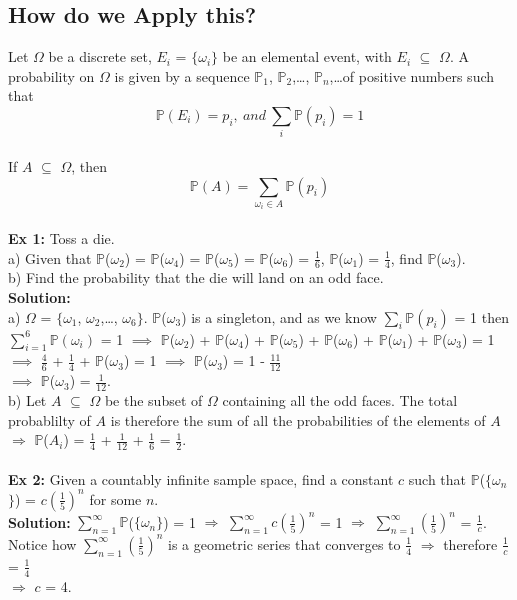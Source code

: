 \documentclass{article}
\newcommand{\bbP}{\mathbb{P}}
\newcommand{\Om}{\Omega}
\newcommand{\imply}{\Rightarrow}
\begin{document}
\subsection{How do we Apply this?}
Let $\Om$ be a discrete set, $E_{i}$ = $\{$$\omega_{i}$$\}$ be an elemental event, with $E_{i}$ $\subseteq$ $\Om$. A probability on $\Om$ is given by a sequence $\bbP_{1}$, $\bbP_{2}$,\dots, $\bbP_{n}$,\dots of positive numbers such that
\[ \bbP(E_{i}) = p_{i},\ and\ \sum_{i} \bbP(p_{i}) = 1\]\\
If $A$ $\subseteq$ $\Om$, then
\[ \bbP(A) = \sum_{\omega_{i} \in A} \bbP(p_{i})\]\\
\textbf{Ex 1:} Toss a die.\\
a) Given that $\bbP$($\omega_{2}$) = $\bbP$($\omega_{4}$) = $\bbP$($\omega_{5}$) = $\bbP$($\omega_{6}$) = $\frac{1}{6}$, $\bbP$($\omega_{1}$) = $\frac{1}{4}$, find $\bbP$($\omega_{3}$).\\
b) Find the probability that the die will land on an odd face.\\
\textbf{Solution:}\\
a) $\Omega$ = $\{$$\omega_{1}$, $\omega_{2}$,\dots, $\omega_{6}$$\}$. $\bbP$($\omega_{3}$) is a singleton, and as we know $\sum_{i} \bbP(p_{i})$ = 1 then  $\sum_{i=1}^{6}\bbP(\omega_{i})$ = 1 $\implies$ $\bbP$($\omega_{2}$) + $\bbP$($\omega_{4}$) + $\bbP$($\omega_{5}$) + $\bbP$($\omega_{6}$) + $\bbP$($\omega_{1}$) + $\bbP$($\omega_{3}$) = 1 $\implies$ $\frac{4}{6}$ + $\frac{1}{4}$ + $\bbP$($\omega_{3}$) = 1 $\implies$ $\bbP$($\omega_{3}$) = 1 - $\frac{11}{12}$\\
$\implies$ $\bbP$($\omega_{3}$) = $\frac{1}{12}$.\\
b) Let $A$ $\subseteq$ $\Om$ be the subset of $\Om$ containing all the odd faces. The total probablilty of $A$ is therefore the sum of all the probabilities of the elements of $A$ $\imply$ $\bbP$($A_{i}$) = $\frac{1}{4}$ + $\frac{1}{12}$ + $\frac{1}{6}$ = $\frac{1}{2}$.\\\\
\textbf{Ex 2:} Given a countably infinite sample space, find a constant $c$ such that $\bbP$($\{$$\omega_{n}$$\}$) = $c(\frac{1}{5})^n$ for some $n$.\\
\textbf{Solution:} $\sum_{n=1}^{\infty} \bbP$($\{$$\omega_{n}$$\}$) = 1 $\imply$ $\sum_{n=1}^{\infty} c(\frac{1}{5})^n$ = 1 $\imply$ $\sum_{n=1}^{\infty} (\frac{1}{5})^n$ = $\frac{1}{c}$. Notice how $\sum_{n=1}^{\infty} (\frac{1}{5})^n$ is a geometric series that converges to $\frac{1}{4}$ $\imply$ therefore $\frac{1}{c}$ = $\frac{1}{4}$\\
$\imply$ $c$ = 4.
\newpage
\end{document}
